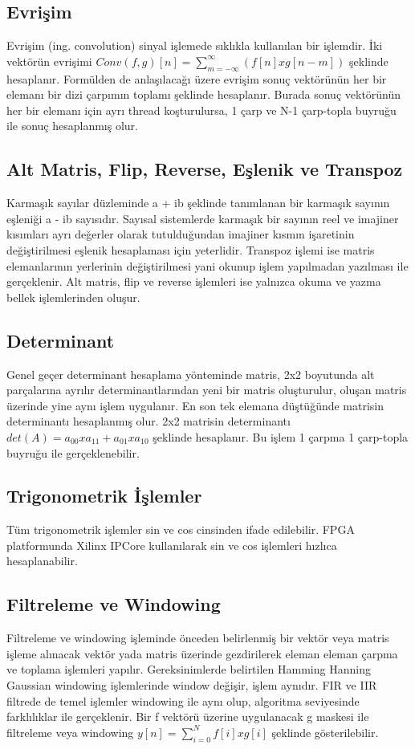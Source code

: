 \subsection{Evrişim}
Evrişim (ing. convolution) sinyal işlemede sıklıkla kullanılan bir işlemdir. İki vektörün evrişimi $Conv(f,g)[n]=\sum_{m=-\infty}^{\infty}(f[n]xg[n-m])$ şeklinde hesaplanır. Formülden de anlaşılacağı üzere evrişim sonuç vektörünün her bir elemanı bir dizi çarpımın toplamı şeklinde hesaplanır. Burada sonuç vektörünün her bir elemanı için ayrı thread koşturulursa, 1 çarp ve N-1 çarp-topla buyruğu ile sonuç hesaplanmış olur. 

\subsection{Alt Matris, Flip, Reverse, Eşlenik ve Transpoz}
Karmaşık sayılar düzleminde a + ib şeklinde tanımlanan bir karmaşık sayının eşleniği a - ib sayısıdır. Sayısal sistemlerde karmaşık bir sayının reel ve imajiner kısımları ayrı değerler olarak tutulduğundan imajiner kısmın işaretinin değiştirilmesi eşlenik hesaplaması için yeterlidir. Transpoz işlemi ise matris elemanlarının yerlerinin değiştirilmesi yani okunup işlem yapılmadan yazılması ile gerçeklenir. Alt matris, flip ve reverse işlemleri ise yalnızca okuma ve yazma bellek işlemlerinden oluşur. 

\subsection{Determinant}
Genel geçer determinant hesaplama yönteminde matris, 2x2 boyutunda alt parçalarına ayrılır determinantlarından yeni bir matris oluşturulur, oluşan matris üzerinde yine aynı işlem uygulanır. En son tek elemana düştüğünde matrisin determinantı hesaplanmış olur. 2x2 matrisin determinantı $det(A) = a_{00} x a_{11} + a_{01} x a_{10}$ şeklinde hesaplanır. Bu işlem 1 çarpma 1 çarp-topla buyruğu ile gerçeklenebilir.

\subsection{Trigonometrik İşlemler}
Tüm trigonometrik işlemler sin ve cos cinsinden ifade edilebilir. FPGA platformunda Xilinx IPCore kullanılarak sin ve cos işlemleri hızlıca hesaplanabilir. 

\subsection{Filtreleme ve Windowing}
Filtreleme ve windowing işleminde önceden belirlenmiş bir vektör veya matris işleme alınacak vektör yada matris üzerinde gezdirilerek eleman eleman çarpma ve toplama işlemleri yapılır. Gereksinimlerde belirtilen Hamming Hanning Gaussian windowing işlemlerinde window değişir, işlem aynıdır. FIR ve IIR filtrede de temel işlemler windowing ile aynı olup, algoritma seviyesinde farklılıklar ile gerçeklenir. Bir f vektörü üzerine uygulanacak g maskesi ile filtreleme veya windowing $y[n] = \sum_{i=0}^{N}f[i]xg[i]$ şeklinde gösterilebilir. 

